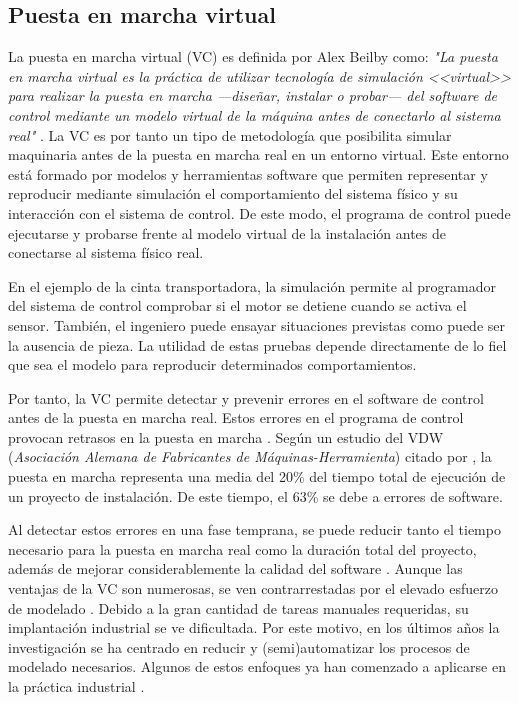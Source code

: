 \subsection{Puesta en marcha virtual} \label{subsec:vc}

La puesta en marcha virtual (VC) es definida por Alex Beilby como: \textit{"La puesta en marcha virtual es la práctica de utilizar tecnología de simulación <<virtual>> para realizar la puesta en marcha —diseñar, instalar o probar— del software de control mediante un modelo virtual de la máquina antes de conectarlo al sistema real"} . La VC es por tanto un tipo de metodología que posibilita simular maquinaria antes de la puesta en marcha real en un entorno virtual. Este entorno está formado por modelos y herramientas software que permiten representar y reproducir mediante simulación el comportamiento del sistema físico y su interacción con el sistema de control. De este modo, el programa de control puede ejecutarse y probarse frente al modelo virtual de la instalación antes de conectarse al sistema físico real. 

En el ejemplo de la cinta transportadora, la simulación permite al programador del sistema de control comprobar si el motor se detiene cuando se activa el sensor. También, el ingeniero puede ensayar situaciones previstas como puede ser la ausencia de pieza. La utilidad de estas pruebas depende directamente de lo fiel que sea el modelo para reproducir determinados comportamientos.

Por tanto, la VC permite detectar y prevenir errores en el software de control antes de la puesta en marcha real. Estos errores en el programa de control provocan retrasos en la puesta en marcha . Según un estudio del VDW (\textit{Asociación Alemana de Fabricantes de Máquinas-Herramienta}) citado por , la puesta en marcha representa una media del 20\% del tiempo total de ejecución de un proyecto de instalación. De este tiempo, el 63\% se debe a errores de software. 

Al detectar estos errores en una fase temprana, se puede reducir tanto el tiempo necesario para la puesta en marcha real como la duración total del proyecto, además de mejorar considerablemente la calidad del software . Aunque las ventajas de la VC son numerosas, se ven contrarrestadas por el elevado esfuerzo de modelado . Debido a la gran cantidad de tareas manuales requeridas, su implantación industrial se ve dificultada. Por este motivo, en los últimos años la investigación se ha centrado en  reducir y (semi)automatizar los procesos de modelado necesarios. Algunos de estos enfoques ya han comenzado a aplicarse en la práctica industrial .


